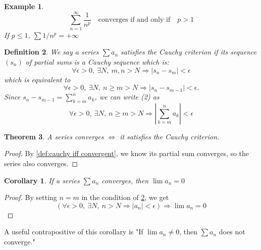 \documentclass[12pt, lettersize]{book}
\newtheorem{thm}{Theorem}[section]
\newtheorem{dfn}[thm]{Definition}
\newtheorem{eg}[thm]{Example}
\newtheorem{cor}{Corollary}[thm]
\begin{document}
		\begin{eg}
		\begin{displaymath}
			\sum_{n=1}^{\infty}\frac{1}{n^p}\quad \text{converges if and only if}\quad p>1
		\end{displaymath}
		If $p\leq1$, $\sum1/n^p=+\infty$
		\end{eg}
		
		\setcounter{equation}{0}
		\begin{dfn}\label{def:cauchy criterion}
		We say a series $\sum a_n$ satisfies the \emph{Cauchy criterion} if its sequence $(s_n)$ of partial sums is a
		Cauchy sequence which is:
		\begin{equation}
			\forall\epsilon>0,\ \exists N,\ m,n>N\Rightarrow|s_n-s_m|<\epsilon
		\end{equation}
		which is equivalent to
		\begin{equation}
			\forall\epsilon>0,\ \exists N,\ n\geq m>N\Rightarrow|s_n-s_{m-1}|<\epsilon.
		\end{equation}
		Since $s_n-s_{m-1}=\sum_{k=m}^{n}a_k$, we can write (2) as
		\begin{equation}
			\forall\epsilon>0,\ \exists N,\ n\geq m>N\Rightarrow\left|\sum_{k=m}^{n}a_k\right|<\epsilon
		\end{equation}
		\end{dfn}
		
		\begin{thm}
		A series converges $\iff$ it satisfies the Cauchy criterion. 
		\end{thm}
		\begin{proof}
		By \ref{def:cauchy iff convergent}, we know its partial sum converges, so the series also converges.
		\end{proof}
		\begin{cor}\label{def:If a_n converges then lim(a_n)=0}
		If a series $\sum a_n$ converges, then $\lim a_n=0$
		\end{cor}
		\begin{proof}
		By setting $n=m$ in the condition of \ref{def:cauchy criterion}, we get
		\begin{displaymath}
			\left(\forall\epsilon>0,\ \exists N,\ n>N\Rightarrow\left|a_n\right|<\epsilon\right)\Rightarrow\lim a_n=0
		\end{displaymath}
		\end{proof}
		A useful contrapositive of this corollary is "If $\lim a_n\neq0$, then $\sum a_n$ does not converge."
		
\end{document}
